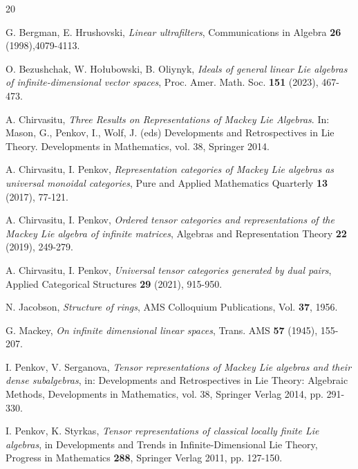 \documentclass[12pt]{article}
\begin{document}
\small{
\begin{thebibliography}{20}

 G. Bergman, E. Hrushovski, {\it Linear ultrafilters}, Communications in Algebra {\bf 26} (1998),4079-4113.

 O. Bezushchak, W. Ho{\l}ubowski, B. Oliynyk, {\it Ideals of general linear Lie algebras of infinite-dimensional vector spaces}, Proc. Amer. Math. Soc. {\bf 151} (2023), 467-473.


 A. Chirvasitu, {\it Three Results on Representations of Mackey Lie Algebras}. In: Mason, G., Penkov, I., Wolf, J. (eds) Developments and Retrospectives in Lie Theory. Developments in Mathematics, vol. 38, Springer 2014.

 A. Chirvasitu, I. Penkov, {\it Representation categories of Mackey Lie algebras as universal monoidal categories}, Pure and Applied Mathematics Quarterly {\bf 13} (2017), 77-121.

 A. Chirvasitu, I. Penkov, {\it Ordered tensor categories and representations of the Mackey Lie algebra of infinite matrices}, Algebras and Representation Theory {\bf 22} (2019), 249-279.

 A. Chirvasitu, I. Penkov, {\it Universal tensor categories generated by dual pairs}, Applied Categorical Structures {\bf 29} (2021), 915-950.

 N. Jacobson, {\it Structure of rings}, AMS Colloquium Publications, Vol. {\bf 37}, 1956.

 G. Mackey, {\it On infinite dimensional linear spaces}, Trans. AMS {\bf 57} (1945), 155-207.

 I. Penkov, V. Serganova, {\it Tensor representations of Mackey Lie algebras and their dense subalgebras}, in: Developments and Retrospectives in Lie Theory: Algebraic Methods, Developments in Mathematics, vol. 38, Springer Verlag 2014, pp. 291-330.

 I. Penkov, K. Styrkas, {\it Tensor representations of classical locally finite Lie algebras}, in Developments and Trends in Infinite-Dimensional Lie Theory, Progress in Mathematics {\bf 288}, Springer Verlag 2011, pp. 127-150.


\end{thebibliography}}
\end{document}
